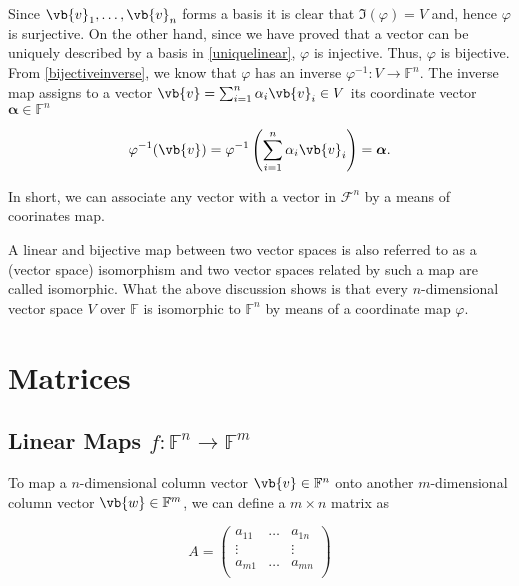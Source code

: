 \documentclass[a4paper,12pt]{report}
\begin{document}
Since \(\vb{v}_{1}, \ldots, \vb{v}_n \) forms a basis it is clear that \(\Im (\varphi ) = V\) and, hence \(\varphi \) is surjective. On the other hand, since we have proved that a vector can be uniquely described by a basis in \cref{uniquelinear}, \(\varphi \) is injective. Thus, \(\varphi \) is bijective. From \cref{bijectiveinverse}, we know that \(\varphi \) has an inverse \(\varphi ^{-1} : V \rightarrow \mathbb{F}^{n} \). The inverse map assigns to a vector \(\vb{v} = \sum_{i=1}^{n} \alpha _{i} \vb{v} _{i} \in V\) its coordinate vector \(\boldsymbol{\alpha } \in \mathbb{F}^{n}  \)

\begin{equation}
    \varphi ^{-1} (\vb{v} ) = \varphi ^{-1} \left( \sum_{i=1}^{n} \alpha _{i} \vb{v} _{i}  \right) = \boldsymbol{\alpha }. 
\end{equation}

In short, we can associate any vector with a vector in \(\mathcal{F}^{n} \) by a means of coorinates map. 

A linear and bijective map between two vector spaces is also referred to as a (vector space) isomorphism and two vector spaces related by such a map are called isomorphic. What the above discussion shows is that every \(n\)-dimensional vector space \(V\) over \(\mathbb{F}\) is isomorphic to \(\mathbb{F}^{n} \) by means of a coordinate map \(\varphi \). 

\section{Matrices}

\subsection{Linear Maps \(f: \mathbb{F}^{n} \rightarrow \mathbb{F}^{m}  \)}
To map a \(n\)-dimensional column vector \(\vb{v} \in \mathbb{F}^{n} \) onto another \(m\)-dimensional column vector \(\vb{w} \in \mathbb{F}^{m} \), we can define a \(m \times  n\) matrix as 

\begin{equation}
    A = \begin{pmatrix}
        a_{11} & \ldots  & a_{1n}   \\
        \vdots  &  & \vdots  \\
        a_{m1}  & \ldots  & a_{mn}  \\
    \end{pmatrix}
\end{equation}
\end{document}
